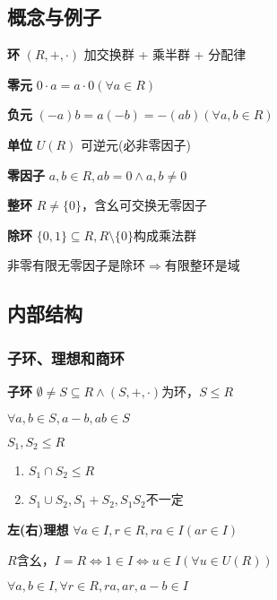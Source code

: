 \documentclass[b4paper, 10pt]{ctexart}
\newcommand*{\impl}{\Rightarrow}
\renewcommand*{\iff}{\Leftrightarrow}
\renewcommand*{\leq}{\leqslant}
\begin{document}
\begin{multicols}{3}
    \subsection{概念与例子}

    \textbf{环} $(R, +, \cdot)$ 加交换群 + 乘半群 + 分配律

    \textbf{零元} $0 \cdot a = a \cdot 0 (\forall a \in R)$

    \textbf{负元} $(-a)b = a(-b) = -(ab) (\forall a, b \in R)$

    \textbf{单位} $U(R)$ 可逆元(必非零因子)

    \textbf{零因子} $a, b \in R, ab = 0 \wedge a, b \ne 0$

    \textbf{整环} $R\ne \{0\}$，含幺可交换无零因子

    \textbf{除环} $\{0, 1\} \subseteq R, R \setminus \{0\}$构成乘法群

    非零有限无零因子是除环$\!\impl\!$有限整环是域

    \subsection{内部结构}

    \subsubsection{子环、理想和商环}

    \textbf{子环} $\emptyset \!\neq\! S \!\subseteq\! R \wedge (S, +, \cdot)$为环，$S \leq R$

    \begin{theorem}[子环判则]
        $\forall a, b \in S, a - b, ab \in S$
    \end{theorem}

    \begin{theorem}[子环运算律]
        $S_1, S_2 \leq R$
        \begin{enumerate}
            \item $S_1 \cap S_2 \leq R$
            \item $S_1 \cup S_2, S_1 + S_2, S_1S_2$不一定
        \end{enumerate}
    \end{theorem}

    \textbf{左(右)理想} $\forall a \in I, r \in R, ra \in I (ar \in I)$

    $R$含幺，$I \! = \! R \iff 1 \!\in\! I \iff u \!\in\! I (\forall u \!\in\! U(R))$

    \begin{theorem}[理想判则]
        $\forall a, b \!\in\! I, \forall r \!\in\! R, ra, ar, a-b \in I$
    \end{theorem}


\end{multicols}
\end{document}
